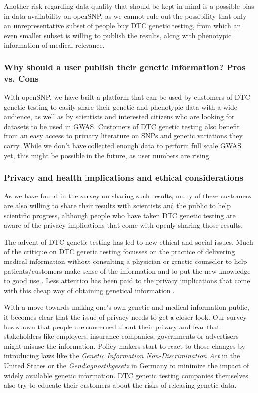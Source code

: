 \documentclass[10pt]{article}
\begin{document}
Another risk regarding data quality that should be kept in mind is a possible bias in data availability on openSNP, as we cannot rule out the possibility that only an unrepresentative subset of people buy DTC genetic testing, from which an even smaller subset is willing to publish the results, along with phenotypic information of medical relevance.

\subsubsection*{Why should a user publish their genetic information? Pros vs. Cons}
With openSNP, we have built a platform that can be used by customers of DTC genetic testing to easily share their genetic and phenotypic data with a wide audience, as well as by scientists and interested citizens who are looking for datasets to be used in GWAS. Customers of DTC genetic testing also benefit from an easy access to primary literature on SNPs and genetic variations they carry. While we don't have collected enough data to perform full scale GWAS yet, this might be possible in the future, as user numbers are rising. 
\subsubsection*{Privacy and health implications and ethical considerations}

As we have found in the survey on sharing such results, many of these customers are also willing to share their results with scientists and the public to help scientific progress, although people who have taken DTC genetic testing are aware of the privacy implications that come with openly sharing those results.      

The advent of DTC genetic testing has led to new ethical and social issues. Much of the critique on DTC genetic testing focusses on the practice of delivering medical information without consulting a physician or genetic counselor to help patients/customers make sense of the information and to put the new knowledge to good use \cite{Hauskeller2011,Hogarth2008,Wasson2009}. Less attention has been paid to the privacy implications that come with this cheap way of obtaining genetical information \cite{Caulfield2011,Joh2011}. 

With a move towards making one's own genetic and medical information public, it becomes clear that the issue of privacy needs to get a closer look. Our survey has shown that people are concerned about their privacy and fear that stakeholders like employers, insurance companies, governments or advertisers might misuse the information. Policy makers start to react to those changes by introducing laws like the \textit{Genetic Information Non-Discrimination Act} in the United States or the \emph{Gendiagnostikgesetz} in Germany to minimize the impact of widely available genetic information. DTC genetic testing companies themselves also try to educate their customers about the risks of releasing genetic data.  
\end{document}
